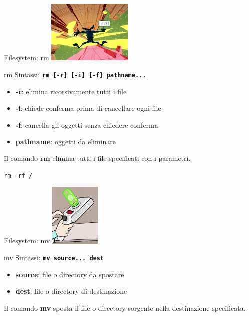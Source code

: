 \documentclass{beamer}
\begin{document}
    \begin{frame}{Filesystem: rm}
        \centering
        \includegraphics[height=3cm, keepaspectratio]{images/willy.jpg}

        \begin{block}{rm}
            \small
            Sintassi: \texttt{\textbf{rm [-r] [-i] [-f] pathname...}}

            \begin{itemize}
                \item \textbf{-r}: elimina ricorsivamente tutti i file
                \item \textbf{-i}: chiede conferma prima di cancellare ogni file
                \item \textbf{-f}: cancella gli oggetti senza chiedere conferma
                \item \textbf{pathname}: oggetti da eliminare
            \end{itemize}

            Il comando \textbf{rm} elimina tutti i file specificati con i parametri.
        \end{block}
    \end{frame}

    \begin{frame}{}
        \centering
        \Huge \texttt{rm -rf /}
    \end{frame}

    \begin{frame}{Filesystem: mv}
        \centering
        \includegraphics[height=3cm, keepaspectratio]{images/spara-porte.png}

        \begin{block}{mv}
            \small
            Sintassi: \texttt{\textbf{mv source... dest}}

            \begin{itemize}
                \item \textbf{source}: file o directory da spostare
                \item \textbf{dest}: file o directory di destinazione
            \end{itemize}

            Il comando \textbf{mv} sposta il file o directory sorgente nella destinazione specificata.
        \end{block}
    \end{frame}
\end{document}
